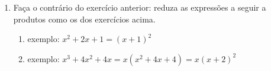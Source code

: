 \documentclass{article}
\begin{document}
\begin{enumerate}
		\item Faça o contrário do exercício anterior: reduza as expressões a seguir a produtos 
		como os dos exercícios acima.
		\begin{enumerate}
			\item exemplo: $x^2 + 2x + 1 = (x+1)^2$
			\item exemplo: $x^3 + 4x^2 + 4x = x(x^2 + 4x + 4) = x(x+2)^2$
		\end{enumerate}

\end{enumerate}
	
\end{document}
